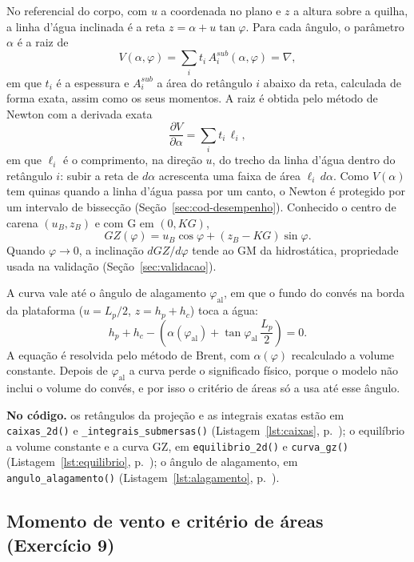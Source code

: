 \documentclass[11pt,a4paper]{article}
\newcommand{\notacodigo}[1]{\begin{nocodigo}\textbf{\sffamily\color{azul}No código.} #1\end{nocodigo}}
\newcommand{\lst}[1]{Listagem~\ref{lst:#1}, p.~\pageref{lst:#1}}
\newcommand{\phial}{\varphi_{\mathrm{al}}}
\begin{document}
No referencial do corpo, com $u$ a coordenada no plano e $z$ a altura sobre a quilha, a linha
d'água inclinada é a reta $z = \alpha + u\tan\varphi$. Para cada ângulo, o parâmetro $\alpha$ é a
raiz de
\begin{equation}
V(\alpha, \varphi) = \sum_i t_i\, A_i^{sub}(\alpha, \varphi) = \nabla ,
\end{equation}
em que $t_i$ é a espessura e $A_i^{sub}$ a área do retângulo $i$ abaixo da reta, calculada de forma
exata, assim como os seus momentos. A raiz é obtida pelo método de Newton com a derivada exata
\begin{equation}
\frac{\partial V}{\partial \alpha} = \sum_i t_i\, \ell_i ,
\end{equation}
em que $\ell_i$ é o comprimento, na direção $u$, do trecho da linha d'água dentro do retângulo
$i$: subir a reta de $d\alpha$ acrescenta uma faixa de área $\ell_i\,d\alpha$. Como $V(\alpha)$ tem
quinas quando a linha d'água passa por um canto, o Newton é protegido por um intervalo de
bissecção (Seção~\ref{sec:cod-desempenho}). Conhecido o centro de carena $(u_B, z_B)$ e com G em
$(0, KG)$,
\begin{equation}
GZ(\varphi) = u_B \cos\varphi + (z_B - KG)\sin\varphi .
\end{equation}
Quando $\varphi \to 0$, a inclinação $dGZ/d\varphi$ tende ao GM da hidrostática, propriedade usada
na validação (Seção~\ref{sec:validacao}).

A curva vale até o ângulo de alagamento $\phial$, em que o fundo do convés na borda da plataforma
($u = L_p/2$, $z = h_p + h_c$) toca a água:
\begin{equation}
h_p + h_c - \left(\alpha(\phial) + \tan\phial\,\frac{L_p}{2}\right) = 0 .
\end{equation}
A equação é resolvida pelo método de Brent, com $\alpha(\varphi)$ recalculado a volume constante.
Depois de $\phial$ a curva perde o significado físico, porque o modelo não inclui o volume do
convés, e por isso o critério de áreas só a usa até esse ângulo.

\notacodigo{os retângulos da projeção e as integrais exatas estão em \texttt{caixas\_2d()} e
\texttt{\_integrais\_submersas()} (\lst{caixas}); o equilíbrio a volume constante e a curva GZ,
em \texttt{equilibrio\_2d()} e \texttt{curva\_gz()} (\lst{equilibrio}); o ângulo de alagamento, em
\texttt{angulo\_alagamento()} (\lst{alagamento}).}

\subsection{Momento de vento e critério de áreas (Exercício 9)}\label{sec:vento-teoria}
\end{document}
